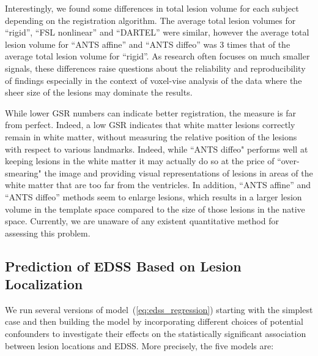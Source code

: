 \documentclass[10pt]{article}
\begin{document}
Interestingly, we found some differences in total lesion volume for each subject depending on the registration algorithm. The average total lesion volumes for ``rigid'', ``FSL nonlinear'' and ``DARTEL'' were similar, however the average total lesion volume for ``ANTS affine'' and ``ANTS diffeo'' was 3 times that of the average total lesion volume for ``rigid''. As research often focuses on much smaller signals, these differences raise questions about the reliability and reproducibility of findings especially in the context of voxel-vise analysis of the data where the sheer size of the lesions may dominate the results. 

While lower GSR numbers can indicate better registration, the
measure is far from perfect. Indeed, a low GSR indicates that white
matter lesions correctly remain in white matter, without measuring
the relative position of the lesions with respect to various
landmarks. Indeed, while ``ANTS diffeo" performs well at keeping
lesions in the white matter it may actually do so at the price of
``over-smearing" the image and providing visual representations of
lesions in areas of the white matter that are too far from the
ventricles. In addition, ``ANTS affine'' and ``ANTS diffeo'' methods seem to enlarge lesions, which results in a larger lesion volume in the template space compared to the size of those lesions in the native space. Currently, we are unaware of any existent quantitative method for assessing this problem.


\subsection*{Prediction of EDSS Based on Lesion Localization}


We run several versions of model~(\ref{eq:edss_regression}) starting with the simplest case and then building the model by incorporating different choices of potential confounders to investigate their effects on the statistically significant association between lesion locations and EDSS. More precisely, the five models are:
\end{document}
